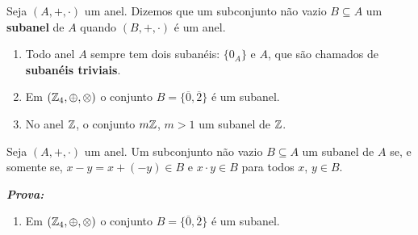 \documentclass{beamer}
\begin{document}
    \begin{frame}
        \begin{definicao}
            Seja $(A, +, \cdot)$ um anel. \pause Dizemos que um subconjunto n{\~a}o vazio \pause $B\subseteq A$  um \textbf{subanel} de $A$ \pause quando $(B, +, \cdot)$ \'e um anel.\pause
        \end{definicao}

        \begin{exemplos}
            \begin{enumerate}[label={\arabic*})]
                \item Todo anel $A$ sempre tem dois suban{\'e}is: \pause $\{0_{A}\}$ \pause e $A$, \pause que s{\~a}o chamados de \textbf{suban{\'e}is triviais}.\pause

                \vspace{.5cm}

                \item Em $(\mathbb{Z}_4,\oplus,\otimes)$ \pause o conjunto $B = \{\overline{0}, \overline{2}\}$ \'e um subanel.\pause

                \vspace{.5cm}
                
                \item No anel $\mathbb{Z}$, \pause o conjunto $m\mathbb{Z}$, $m > 1$  um subanel de $\mathbb{Z}$.\pause

                \vspace{.5cm}
            \end{enumerate} 
        \end{exemplos}
    \end{frame}

    \begin{frame}
        \begin{proposicao}
            Seja $(A, +,\cdot)$ um anel. \pause Um subconjunto n{\~a}o vazio \pause $B\subseteq A$  um subanel de $A$ \pause se, e somente se, \pause $x - y = x + (-y) \in B$ \pause e $x\cdot y \in B$ \pause para todos $x$, $y \in B$.\pause
        \end{proposicao}

        \noindent \textbf{\textit{Prova: }}\pause
    \end{frame}

    \begin{frame}
        \begin{exemplos}
            \begin{enumerate}[label={\arabic*})]
                \item Em $(\mathbb{Z}_4,\oplus,\otimes)$ \pause o conjunto $B = \{\overline{0}, \overline{2}\}$ \'e um subanel.\pause

                \vspace{5cm}
                
                \seti
            \end{enumerate}
        \end{exemplos}
    \end{frame}
\end{document}
